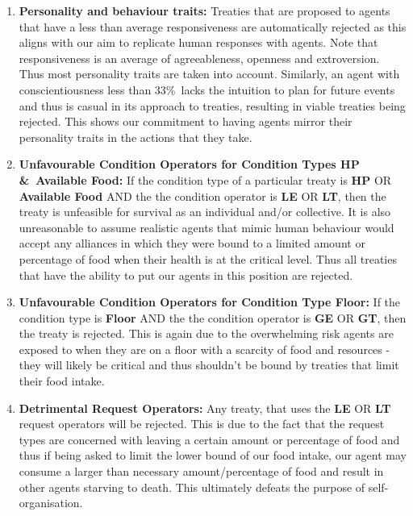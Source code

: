 \begin{enumerate}
    \item 
    \textbf{Personality and behaviour traits:} \newline
    Treaties that are proposed to agents that have a less than average responsiveness are automatically rejected as this aligns with our aim to replicate human responses with agents. Note that responsiveness is an average of agreeableness, openness and extroversion. Thus most personality traits are taken into account. Similarly, an agent with conscientiousness less than 33\%\ lacks the intuition to plan for future events and thus is casual in its approach to treaties, resulting in viable treaties being rejected. This shows our commitment to having agents mirror their personality traits in the actions that they take.
    
    \item 
    \textbf{Unfavourable Condition Operators for Condition Types HP \&\ Available Food:} \newline
    If the condition type of a particular treaty is \textbf{HP} OR \textbf{Available Food} AND the the condition operator is \textbf{LE} OR \textbf{LT}, then the treaty is unfeasible for survival as an individual and/or collective. It is also unreasonable to assume realistic agents that mimic human behaviour would accept any alliances in which they were bound to a limited amount or percentage of food when their health is at the critical level. Thus all treaties that have the ability to put our agents in this position are rejected.
    
    \item 
    \textbf{Unfavourable Condition Operators for Condition Type Floor:} \newline
    If the condition type is \textbf{Floor} AND the the condition operator is \textbf{GE} OR \textbf{GT}, then the treaty is rejected. This is again due to the overwhelming risk agents are exposed to when they are on a floor with a scarcity of food and resources - they will likely be critical and thus shouldn't be bound by treaties that limit their food intake.
    
    \item 
    \textbf{Detrimental Request Operators:}\newline
    Any treaty, that uses the \textbf{LE} OR \textbf{LT} request operators will be rejected. This is due to the fact that the request types are concerned with leaving a certain amount or percentage of food and thus if being asked to limit the lower bound of our food intake, our agent may consume a larger than necessary amount/percentage of food and result in other agents starving to death. This ultimately defeats the purpose of self-organisation.
    

\end{enumerate}
